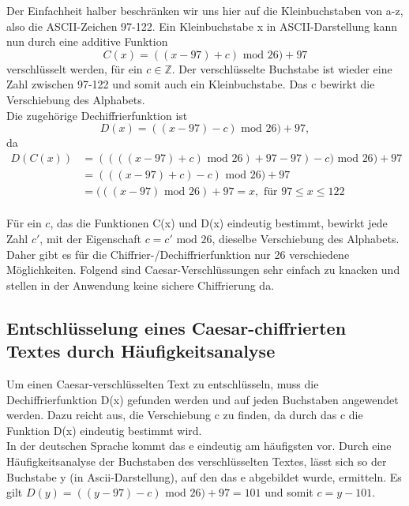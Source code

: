 \documentclass[ngerman,12pt]{article}
\def\mod{\mbox{ mod }}
\begin{document}
Der Einfachheit halber beschränken wir uns hier auf die Kleinbuchstaben von a-z, also die ASCII-Zeichen 97-122.
Ein Kleinbuchstabe x in ASCII-Darstellung kann nun durch eine additive Funktion 
\begin{equation*}
C(x)=((x - 97) + c) \mod 26) +97
\end{equation*}
verschlüsselt werden, für ein $c \in \mathbb{Z}$. Der verschlüsselte Buchstabe ist wieder eine Zahl zwischen 97-122 und somit auch ein Kleinbuchstabe. Das c bewirkt die Verschiebung des Alphabets.\\
Die zugehörige Dechiffrierfunktion ist 
\begin{equation*}
D(x)=((x - 97) - c) \mod 26) +97,
\end{equation*}
da 
\begin{equation*}
\begin{aligned}
D(C(x)) &= ((((x - 97) + c) \mod 26) +97 - 97) - c) \mod 26) +97 \\
		   &= (((x - 97) + c) - c) \mod 26) +97 \\
		   &= (((x - 97)\mod 26) +97 = x, \text{ für } 97 \leq x \leq 122
\end{aligned}
\end{equation*}
\\
Für ein $c$, das die Funktionen C(x) und D(x) eindeutig bestimmt, bewirkt jede Zahl $c'$, mit der Eigenschaft $c = c' \mod 26$, dieselbe Verschiebung des Alphabets. Daher gibt es für die Chiffrier-/Dechiffrierfunktion nur 26 verschiedene Möglichkeiten. Folgend sind Caesar-Verschlüssungen sehr einfach zu knacken und stellen in der Anwendung keine sichere Chiffrierung da.

\newpage
\subsection*{Entschlüsselung eines Caesar-chiffrierten Textes durch Häufigkeitsanalyse}

Um einen Caesar-verschlüsselten Text zu entschlüsseln, muss die Dechiffrierfunktion D(x) gefunden werden und auf jeden Buchstaben angewendet werden. Dazu reicht aus, die Verschiebung c zu finden, da durch das c die Funktion D(x) eindeutig bestimmt wird. \\
In der deutschen Sprache kommt das e eindeutig am häufigsten vor. Durch eine Häufigkeitsanalyse der Buchstaben des verschlüsselten Textes, lässt sich so der Buchstabe y (in Ascii-Darstellung), auf den das e abgebildet wurde, ermitteln. Es gilt $D(y) = ((y - 97) - c) \mod 26) +97 = 101$ und somit $c = y - 101$.
\end{document}
